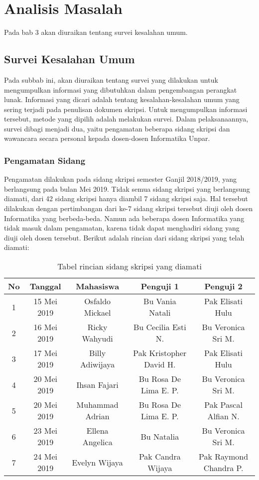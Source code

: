 \chapter{Analisis Masalah}
\label{chap:analisis}

Pada bab 3 akan diuraikan tentang survei kesalahan umum.

\section{Survei Kesalahan Umum}
\label{sec:survei}
Pada subbab ini, akan diuraikan tentang survei yang dilakukan untuk mengumpulkan informasi yang dibutuhkan dalam pengembangan perangkat lunak. Informasi yang dicari adalah tentang kesalahan-kesalahan umum yang sering terjadi pada penulisan dokumen skripsi. Untuk mengumpulkan informasi tersebut, metode yang dipilih adalah melakukan survei. Dalam pelaksanaannya, survei dibagi menjadi dua, yaitu pengamatan beberapa sidang skripsi dan wawancara secara personal kepada dosen-dosen Informatika Unpar. 

\subsection{Pengamatan Sidang}
Pengamatan dilakukan pada sidang skripsi semester Ganjil 2018/2019, yang berlangsung pada bulan Mei 2019. Tidak semua sidang skripsi yang berlangsung diamati, dari 42 sidang skripsi hanya diambil 7 sidang skripsi saja. Hal tersebut dilakukan dengan pertimbangan dari ke-7 sidang skripsi tersebut diuji oleh dosen Informatika yang berbeda-beda. Namun ada beberapa dosen Informatika yang tidak masuk dalam pengamatan, karena tidak dapat menghadiri sidang yang diuji oleh dosen tersebut. Berikut adalah rincian dari sidang skripsi yang telah diamati:

\begin{table}[H]
	\caption {Tabel rincian sidang skripsi yang diamati} \label{tab:pengamatan}
	\begin{center}
	\begin{tabular}{|c|c|c|c|c|}
	\hline 	
	No & Tanggal & Mahasiswa & Penguji 1  & Penguji 2 \\ 
	\hline 
	1 & 15 Mei 2019 & Osfaldo Mickael & Bu Vania Natali & Pak Elisati Hulu \\ 
	\hline 
	2 & 16 Mei 2019 & Ricky Wahyudi & Bu Cecilia Esti N. & Bu Veronica Sri M. \\ 
	\hline 
	3 & 17 Mei 2019 & Billy Adiwijaya & Pak Kristopher David H. & Pak Elisati Hulu \\ 
	\hline 
	4 & 20 Mei 2019 & Ihsan Fajari & Bu Rosa De Lima E. P. & Bu Veronica Sri M. \\ 
	\hline 
	5 & 20 Mei 2019 & Muhammad Adrian & Bu Rosa De Lima E. P. & Pak Pascal Alfian N. \\ 
	\hline 
	6 & 23 Mei 2019 & Ellena Angelica & Bu Natalia & Bu Veronica Sri M. \\ 
	\hline 
	7 & 24 Mei 2019 & Evelyn Wijaya & Pak Candra Wijaya & Pak Raymond Chandra P. \\ 
	\hline 
	\end{tabular} 
\end{center} 
\end{table}

